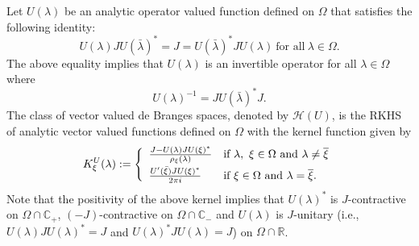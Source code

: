 \documentclass [12pt,reqno]{amsart}
\numberwithin{equation}{subsection}
\numberwithin{equation}{section}
\begin{document}
Let \(U(\lambda)\) be an analytic operator valued function defined on \(\Omega\) that satisfies the following identity:
\begin{equation}\label{Equation 2.2}
U(\lambda)JU(\bar{\lambda})^* = J = U(\bar{\lambda})^*JU(\lambda)~ \mbox{for all}~ \lambda \in \Omega.
\end{equation}
The above equality implies that $U(\lambda)$ is an invertible operator for all $\lambda \in \Omega$ where $$U(\lambda)^{-1}=JU(\bar{\lambda})^*J. $$
The class of vector valued de Branges spaces, denoted by \(\mathcal{H}(U)\), is the RKHS of analytic vector valued functions defined on \(\Omega\) with the kernel function given by \begin{equation} 
K_\xi^{U}(\lambda):= \left\{
    \begin{array}{ll}
         \frac{J-U(\lambda)J U(\xi)^*}{\rho_\xi(\lambda)}  & \mbox{if } \lambda,~\xi \in \Omega~\mbox{and}~\lambda \neq \overline{\xi} \vspace{0.1cm}\\
           \frac{U'(\bar{\xi}) J U(\xi)^*}{2\pi i} & \mbox{if }\xi \in \Omega~\mbox{and}~ \lambda =\overline{\xi}                                                        . \end{array} \right.\label{Equation 2.3}
\end{equation}
Note that the positivity of the above kernel implies that $U(\lambda)^*$ is $J$-contractive on $\Omega \cap \mathbb{C}_+$, $(-J)$-contractive on $\Omega \cap \mathbb{C}_-$ and $U(\lambda)$ is $J$-unitary (i.e., $U(\lambda)JU(\lambda)^*=J$ and $U(\lambda)^*JU(\lambda)=J$) on $\Omega \cap \mathbb{R}$. 
\end{document}
